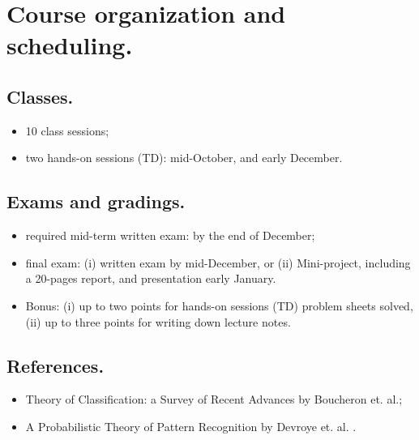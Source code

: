 \appendix

\chapter{Course organization and scheduling.}

		\section{Classes.}
			\begin{itemize}
				\item 10 class sessions;
				\item two hands-on sessions (TD): mid-October, and early December.
			\end{itemize}

		\section{Exams and gradings.}
			\begin{itemize}
				\item required mid-term written exam: by the end of December;
				\item final exam: (i) written exam by mid-December, or (ii) Mini-project, including a 20-pages report, and presentation early January.
				\item Bonus: (i) up to two points for hands-on sessions (TD) problem sheets solved, (ii) up to three points for writing down lecture notes.
			\end{itemize}

		\section{References.}
			\begin{itemize}
				\item Theory of Classification: a Survey of Recent Advances by Boucheron et. al.\cite{tc_Lugosi};
				\item A Probabilistic Theory of Pattern Recognition by Devroye et. al. \cite{ptpr}.
			\end{itemize}